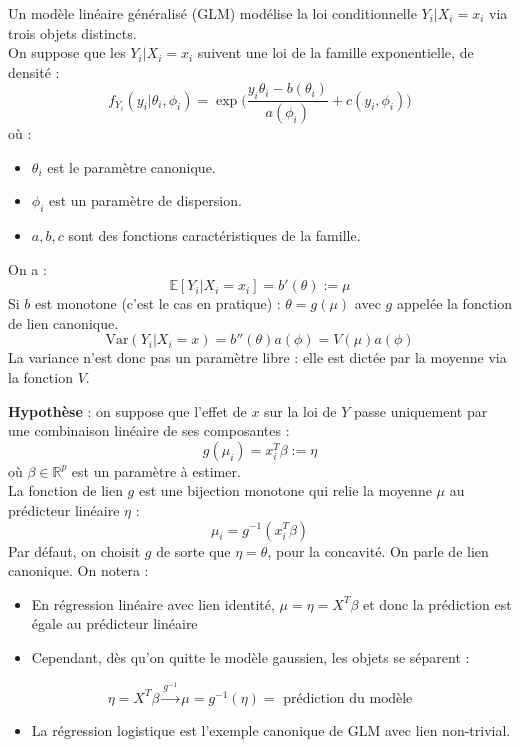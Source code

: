 \documentclass[a4paper,11pt]{paper}
\theoremstyle{plain}
\theoremstyle{definition}
\theoremstyle{remark}
\begin{document}
Un modèle linéaire généralisé (GLM) modélise la loi conditionnelle $Y_i | X_i = x_i$ via trois objets distincts. \\
On suppose que les $Y_i | X_i = x_i$ suivent une loi de la famille exponentielle, de densité :
$$f_{Y_i}(y_i | \theta_i, \phi_i) =\exp\bigg( \dfrac{y_i \theta_i - b(\theta_i)}{a(\phi_i)} + c(y_i, \phi_i)\bigg)$$
où :
\begin{itemize}
    \item $\theta_i$ est le paramètre canonique.
    \item $\phi_i$ est un paramètre de dispersion.
    \item $a, b, c$ sont des fonctions caractéristiques de la famille.
\end{itemize}
On a :
$$\mathbb E[Y_i | X_i= x_i] = b'(\theta) := \mu$$
Si $b$ est monotone (c'est le cas en pratique) :  $\theta = g(\mu)$ avec $g$ appelée la fonction de lien canonique.
$$\text{Var}(Y_i | X_i = x) = b''(\theta)a(\phi) = V(\mu)a(\phi)$$
La variance n'est donc pas un paramètre libre : elle est dictée par la moyenne via la fonction  $V$.


\textbf{Hypothèse} : on suppose que l'effet de $x$ sur la loi de $Y$ passe uniquement par une combinaison linéaire de ses composantes :
$$g(\mu_i) = x_i^T \beta := \eta$$
où $\beta \in \mathbb R^p$ est un paramètre à estimer. \\
La fonction de lien $g$ est une bijection monotone qui relie la moyenne $\mu$ au prédicteur linéaire $\eta$ :
$$\mu_i= g^{-1}(x_i^T \beta)$$
Par défaut, on choisit $g$ de sorte que $\eta = \theta$, pour la concavité. On parle de lien canonique. On notera :
\begin{itemize}
    \item En régression linéaire avec lien identité, $\mu = \eta = X^T \beta$ et donc la prédiction est égale au prédicteur linéaire
    \item Cependant, dès qu'on quitte le modèle gaussien, les objets se séparent :
\end{itemize}

$$\eta = X^T \beta \overset{g^{-1}}{\longrightarrow} \mu = g^{-1}(\eta) = \text{ prédiction du modèle}$$
\begin{itemize}
    \item La régression logistique est l'exemple canonique de GLM avec lien non-trivial.
\end{itemize}
\end{document}
